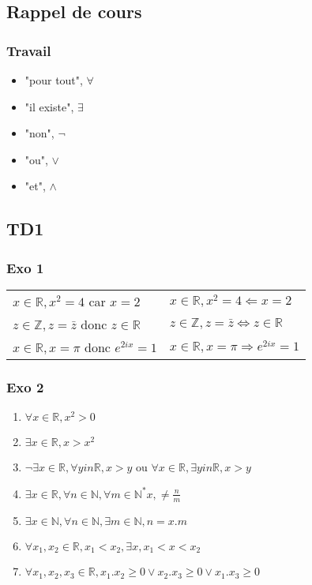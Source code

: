 \documentclass[]{book}
\theoremstyle{definition}
\newcommand{\bb}[1]{\mathbb{#1}}
\newcommand{\Z}{\bb{Z}}
\newcommand{\R}{\bb{R}}
\newcommand{\N}{\bb{N}}
\begin{document}
\subsection*{Rappel de cours}
\subsubsection*{Travail}

\begin{itemize}
\item "pour tout", $\forall$
\item "il existe", $\exists$
\item "non", $\lnot$
\item "ou", $\lor$
\item "et", $\land$
\end{itemize}


\subsection*{TD1}
\subsubsection*{Exo 1}

\begin{tabular}{l l }
$x \in \R, x^2 = 4$ car $x = 2$ & $x \in \R, x^2 = 4 \Leftarrow x = 2$ \\
$z \in \Z, z = \bar{z}$ donc $z \in \R$ & $z \in \Z, z = \bar{z} \Leftrightarrow z \in \R$ \\
$x \in \R, x = \pi$ donc $e^{2ix}= 1$ & $x \in \R, x = \pi \Rightarrow e^{2ix}= 1$ \\
\end{tabular}

\subsubsection*{Exo 2}
\begin{enumerate}
\item $\forall x \in \R, x^2 > 0$
\item $\exists x \in \R, x > x^2$
\item $\lnot \exists x \in \R, \forall y in \R, x > y$ ou $\forall x \in \R, \exists y in \R, x > y$
\item $\exists x \in \R, \forall n \in \N, \forall m \in \N^{*} x, \neq \frac{n}{m}$
\item $\exists x \in \N, \forall n \in \N, \exists m \in \N, n = x . m$
\item $\forall x_1, x_2 \in \R, x_1 < x_2, \exists x, x_1 < x < x_2$
\item $\forall x_1, x_2, x_3 \in \R, x_1.x_2 \geq 0 \lor x_2.x_3 \geq 0 \lor x_1.x_3 \geq 0$
\end{enumerate}
\end{document}

